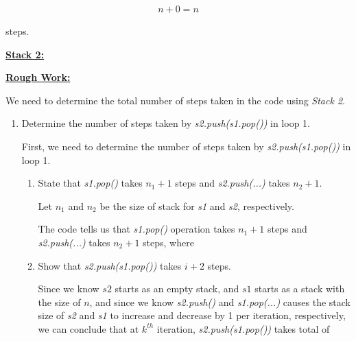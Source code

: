 \documentclass[12pt]{article}
\begin{document}
\begin{enumerate}[a.]
\begin{mdframed}
\begin{mdframed}
        \begin{align}
            n + 0 = n
        \end{align}

        steps.

        \end{mdframed}

    \end{mdframed}

    \bigskip

    \underline{\textbf{Stack 2:}}

    \bigskip

    \begin{mdframed}
        \underline{\textbf{Rough Work:}}

        \bigskip

        We need to determine the total number of steps taken in the code using \textit{Stack 2}.

        \bigskip

        \begin{enumerate}[1.]
            \item Determine the number of steps taken by \textit{s2.push(s1.pop())} in loop 1.

            \bigskip

            First, we need to determine the number of steps taken by \textit{s2.push(s1.pop())} in loop 1.

            \bigskip

            \begin{enumerate}[1.]
                \item State that \textit{s1.pop()} takes $n_1 + 1$ steps and \textit{s2.push(...)}
                takes $n_2 + 1$.

                \begin{mdframed}
                Let $n_1$ and $n_2$ be the size of stack for \textit{s1} and \textit{s2}, respectively.

                \bigskip

                The code tells us that \textit{s1.pop()} operation takes $n_1 + 1$ steps and
                \textit{s2.push(...)} takes $n_2 + 1$ steps, where
                \end{mdframed}

                \item Show that \textit{s2.push(s1.pop())} takes $i + 2$ steps.

                \begin{mdframed}
                Since we know $s2$ starts as an empty stack, and $s1$ starts as a stack
                with the size of $n$, and since we know \textit{s2.push()} and \textit{s1.pop(...)} causes the
                stack size of \textit{s2} and \textit{s1} to increase and decrease by 1 per iteration, respectively,
                we can conclude that at $k^{th}$ iteration, \textit{s2.push(s1.pop())}
                takes total of


\end{mdframed}
\end{enumerate}
\end{enumerate}
\end{mdframed}
\end{enumerate}
\end{document}
